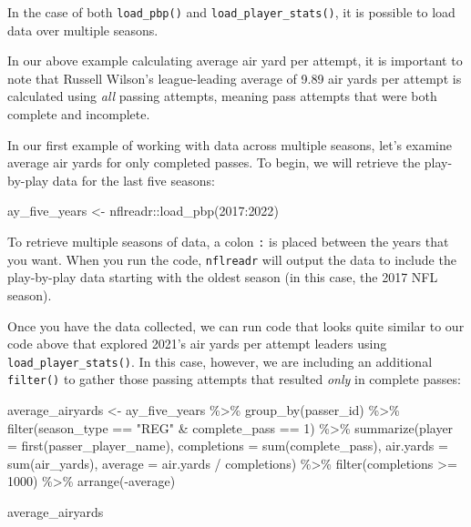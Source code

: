 \documentclass[
  letterpaper,
]{krantz}
\newenvironment{Shaded}{\begin{snugshade}}{\end{snugshade}}
\newcommand{\AttributeTok}[1]{\textcolor[rgb]{0.40,0.45,0.13}{#1}}
\newcommand{\DecValTok}[1]{\textcolor[rgb]{0.68,0.00,0.00}{#1}}
\newcommand{\FunctionTok}[1]{\textcolor[rgb]{0.28,0.35,0.67}{#1}}
\newcommand{\NormalTok}[1]{\textcolor[rgb]{0.00,0.23,0.31}{#1}}
\newcommand{\OtherTok}[1]{\textcolor[rgb]{0.00,0.23,0.31}{#1}}
\newcommand{\SpecialCharTok}[1]{\textcolor[rgb]{0.37,0.37,0.37}{#1}}
\newcommand{\StringTok}[1]{\textcolor[rgb]{0.13,0.47,0.30}{#1}}
\begin{document}
In the case of both \texttt{load\_pbp()} and
\texttt{load\_player\_stats()}, it is possible to load data over
multiple seasons.

In our above example calculating average air yard per attempt, it is
important to note that Russell Wilson's league-leading average of 9.89
air yards per attempt is calculated using \emph{all} passing attempts,
meaning pass attempts that were both complete and incomplete.

In our first example of working with data across multiple seasons, let's
examine average air yards for only completed passes. To begin, we will
retrieve the play-by-play data for the last five seasons:

\begin{Shaded}
\begin{Highlighting}[]
\NormalTok{ay\_five\_years }\OtherTok{\textless{}{-}}\NormalTok{ nflreadr}\SpecialCharTok{::}\FunctionTok{load\_pbp}\NormalTok{(}\DecValTok{2017}\SpecialCharTok{:}\DecValTok{2022}\NormalTok{)}
\end{Highlighting}
\end{Shaded}

To retrieve multiple seasons of data, a colon \texttt{:} is placed
between the years that you want. When you run the code,
\texttt{nflreadr} will output the data to include the play-by-play data
starting with the oldest season (in this case, the 2017 NFL season).

Once you have the data collected, we can run code that looks quite
similar to our code above that explored 2021's air yards per attempt
leaders using \texttt{load\_player\_stats()}. In this case, however, we
are including an additional \texttt{filter()} to gather those passing
attempts that resulted \emph{only} in complete passes:

\begin{Shaded}
\begin{Highlighting}[]
\NormalTok{average\_airyards }\OtherTok{\textless{}{-}}\NormalTok{ ay\_five\_years }\SpecialCharTok{\%\textgreater{}\%}
  \FunctionTok{group\_by}\NormalTok{(passer\_id) }\SpecialCharTok{\%\textgreater{}\%}
  \FunctionTok{filter}\NormalTok{(season\_type }\SpecialCharTok{==} \StringTok{"REG"} \SpecialCharTok{\&}\NormalTok{ complete\_pass }\SpecialCharTok{==} \DecValTok{1}\NormalTok{) }\SpecialCharTok{\%\textgreater{}\%}
  \FunctionTok{summarize}\NormalTok{(}\AttributeTok{player =} \FunctionTok{first}\NormalTok{(passer\_player\_name),}
            \AttributeTok{completions =} \FunctionTok{sum}\NormalTok{(complete\_pass),}
            \AttributeTok{air.yards =} \FunctionTok{sum}\NormalTok{(air\_yards),}
            \AttributeTok{average =}\NormalTok{ air.yards }\SpecialCharTok{/}\NormalTok{ completions) }\SpecialCharTok{\%\textgreater{}\%}
  \FunctionTok{filter}\NormalTok{(completions }\SpecialCharTok{\textgreater{}=} \DecValTok{1000}\NormalTok{) }\SpecialCharTok{\%\textgreater{}\%}
  \FunctionTok{arrange}\NormalTok{(}\SpecialCharTok{{-}}\NormalTok{average)}

\NormalTok{average\_airyards}
\end{Highlighting}
\end{Shaded}
\end{document}
